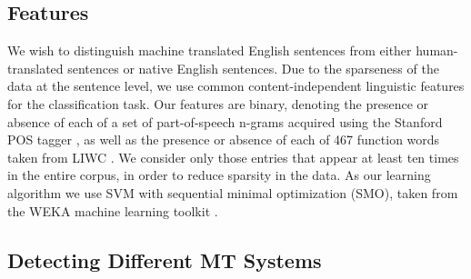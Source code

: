 \documentclass[11pt]{article}
\begin{document}
\subsection{Features}
We wish to distinguish machine translated English sentences from either human-translated sentences or native English sentences. Due to the sparseness of the data at the sentence level, we use common content-independent linguistic features for the classification task. Our features are binary, denoting the presence or absence of each of a set of part-of-speech n-grams acquired using the Stanford POS tagger \cite{Toutanova03feature-richpart-of-speech}, as well as the presence or absence of each of 467 function words taken from LIWC \cite{pennebaker2001linguistic}.
We consider only those entries that appear at least ten times in the entire corpus, in order to reduce sparsity in the data. As our learning algorithm we use SVM with sequential minimal optimization (SMO), taken from the WEKA machine learning toolkit \cite{hall09}. %
%
%
%
%
\subsection{Detecting Different MT Systems}
\end{document}
